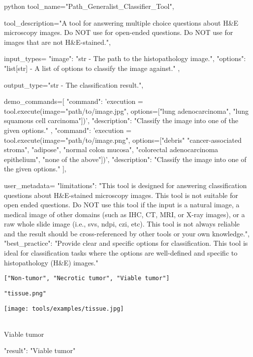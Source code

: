 \begin{codecolorbox}{python}
tool_name="Path_Generalist_Classifier_Tool",

tool_description="A tool for answering multiple choice questions about H&E microscopy images. Do NOT use for open-ended questions. Do NOT use for images that are not H&E-stained.",

input_types={
    "image": "str - The path to the histopathology image.",
    "options": "list[str] - A list of options to classify the image against."
},

output_type="str - The classification result.",

demo_commands=[
    {
        "command": 'execution = tool.execute(image="path/to/image.jpg", options=["lung adenocarcinoma", "lung squamous cell carcinoma"])',
        "description": "Classify the image into one of the given options."
    },
    {
        "command": 'execution = tool.execute(image="path/to/image.png", options=["debris" "cancer-associated stroma", "adipose", "normal colon mucosa", "colorectal adenocarcinoma epithelium", "none of the above"])',
        "description": "Classify the image into one of the given options."
    }
],

user_metadata={
    "limitations": "This tool is designed for answering classification questions about H&E-stained microscopy images. This tool is not suitable for open ended questions. Do NOT use this tool if the input is a natural image, a medical image of other domains (such as IHC, CT, MRI, or X-ray images), or a raw whole slide image (i.e., svs, ndpi, czi, etc). This tool is not always reliable and the result should be cross-referenced by other tools or your own knowledge.",
    "best_practice": "Provide clear and specific options for classification. This tool is ideal for classification tasks where the options are well-defined and specific to histopathology (H&E) images."
}
\end{codecolorbox}


\begin{textcolorbox}

 \texttt{["Non-tumor", "Necrotic tumor", "Viable tumor"]}

 \texttt{"tissue.png"}

\vspace{0.2cm}
\texttt{[image: tools/examples/tissue.jpg]}
\\\\
\begin{codebox}
Viable tumor
\end{codebox}
\begin{codebox}
{
    "result": "Viable tumor"
}
\end{codebox}

\end{textcolorbox}